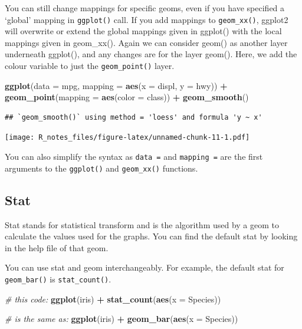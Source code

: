 \documentclass[]{book}
\newenvironment{Shaded}{\begin{snugshade}}{\end{snugshade}}
\newcommand{\KeywordTok}[1]{\textcolor[rgb]{0.13,0.29,0.53}{\textbf{#1}}}
\newcommand{\DataTypeTok}[1]{\textcolor[rgb]{0.13,0.29,0.53}{#1}}
\newcommand{\StringTok}[1]{\textcolor[rgb]{0.31,0.60,0.02}{#1}}
\newcommand{\CommentTok}[1]{\textcolor[rgb]{0.56,0.35,0.01}{\textit{#1}}}
\newcommand{\OperatorTok}[1]{\textcolor[rgb]{0.81,0.36,0.00}{\textbf{#1}}}
\newcommand{\NormalTok}[1]{#1}
\begin{document}
You can still change mappings for specific geoms, even if you have
specified a `global' mapping in \texttt{ggplot()} call. If you add
mappings to \texttt{geom\_xx()}, ggplot2 will overwrite or extend the
global mappings given in ggplot() with the local mappings given in
geom\_xx(). Again we can consider geom() as another layer underneath
ggplot(), and any changes are for the layer geom(). Here, we add the
colour variable to just the \texttt{geom\_point()} layer.

\begin{Shaded}
\begin{Highlighting}[]
\KeywordTok{ggplot}\NormalTok{(}\DataTypeTok{data =}\NormalTok{ mpg, }\DataTypeTok{mapping =} \KeywordTok{aes}\NormalTok{(}\DataTypeTok{x =}\NormalTok{ displ, }\DataTypeTok{y =}\NormalTok{ hwy)) }\OperatorTok{+}\StringTok{ }
\StringTok{  }\KeywordTok{geom_point}\NormalTok{(}\DataTypeTok{mapping =} \KeywordTok{aes}\NormalTok{(}\DataTypeTok{color =}\NormalTok{ class)) }\OperatorTok{+}\StringTok{ }
\StringTok{  }\KeywordTok{geom_smooth}\NormalTok{()}
\end{Highlighting}
\end{Shaded}

\begin{verbatim}
## `geom_smooth()` using method = 'loess' and formula 'y ~ x'
\end{verbatim}

\texttt{[image: R\_notes\_files/figure-latex/unnamed-chunk-11-1.pdf]}

You can also simplify the syntax as \texttt{data\ =} and
\texttt{mapping\ =} are the first arguments to the \texttt{ggplot()} and
\texttt{geom\_xx()} functions.

\subsection{Stat}\label{stat}

Stat stands for statistical transform and is the algorithm used by a
geom to calculate the values used for the graphs. You can find the
default stat by looking in the help file of that geom.

You can use stat and geom interchangeably. For example, the default stat
for \texttt{geom\_bar()} is \texttt{stat\_count()}.

\begin{Shaded}
\begin{Highlighting}[]
\CommentTok{# this code:}
\KeywordTok{ggplot}\NormalTok{(iris) }\OperatorTok{+}\StringTok{ }
\StringTok{  }\KeywordTok{stat_count}\NormalTok{(}\KeywordTok{aes}\NormalTok{(}\DataTypeTok{x =}\NormalTok{ Species))}

\CommentTok{# is the same as:}
\KeywordTok{ggplot}\NormalTok{(iris) }\OperatorTok{+}\StringTok{ }
\StringTok{  }\KeywordTok{geom_bar}\NormalTok{(}\KeywordTok{aes}\NormalTok{(}\DataTypeTok{x =}\NormalTok{ Species))}
\end{Highlighting}
\end{Shaded}
\end{document}
